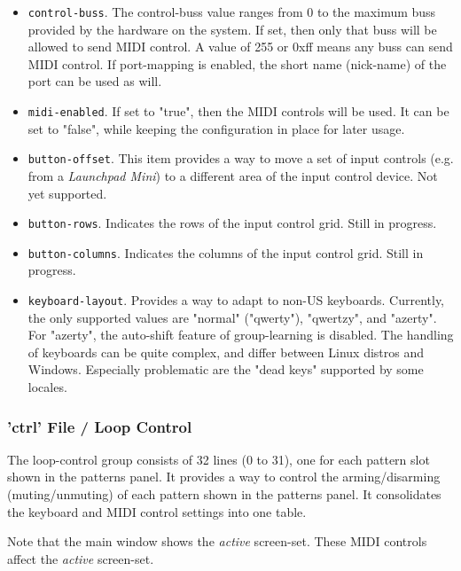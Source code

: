    \begin{itemize}
      \item \texttt{control-buss}.
         The control-buss value ranges from 0 to the maximum buss provided by
         the hardware on the system. If set, then only that buss will be allowed
         to send MIDI control.  A value of 255 or 0xff means any buss can send
         MIDI control. If port-mapping is enabled, the short name (nick-name) of
         the port can be used as will.
      \item \texttt{midi-enabled}.
         If set to "true", then the MIDI controls will be used.
         It can be set to "false", while keeping the configuration in place
         for later usage.
      \item \texttt{button-offset}.
         This item provides a way to move a set of input controls (e.g. from a
         \textsl{Launchpad Mini}) to a different area of the input control
         device.  Not yet supported.
      \item \texttt{button-rows}.
         Indicates the rows of the input control grid.
         Still in progress.
      \item \texttt{button-columns}.
         Indicates the columns of the input control grid.
         Still in progress.
      \item \texttt{keyboard-layout}.
         Provides a way to adapt to non-US keyboards.
         Currently, the only supported values are "normal" ("qwerty"), "qwertzy",
         and "azerty".
         For "azerty", the auto-shift feature of group-learning is disabled.
         The handling of keyboards can be quite complex, and differ between
         Linux distros and Windows.
         Especially problematic are the "dead keys" supported by some locales.
   \end{itemize}

\subsubsection{'ctrl' File / Loop Control}
\label{subsubsec:configuration_ctrl_loop_control}

   The loop-control group consists of 32 lines (0 to 31), one for each
   pattern slot shown in the patterns panel.
   It provides a way to control the arming/disarming (muting/unmuting) of
   each pattern shown in the patterns panel.
   It consolidates the keyboard and MIDI control settings into one table.

   Note that the main window shows the \textsl{active} screen-set.
   These MIDI controls affect the \textsl{active} screen-set.

